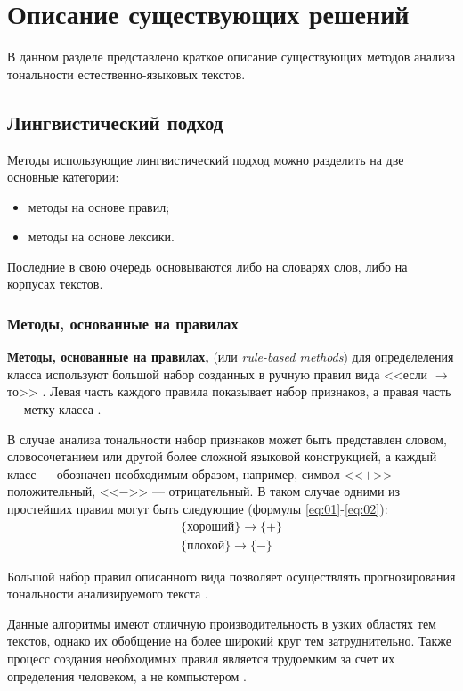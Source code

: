 \chapter{Описание существующих решений}

В данном разделе представлено краткое описание существующих методов анализа
тональности естественно-языковых текстов.

\section{Лингвистический подход}

Методы использующие лингвистический подход можно разделить на две основные
категории:
\begin{itemize}
    \item методы на основе правил;
    \item методы на основе лексики.
\end{itemize}

Последние в свою очередь основываются либо на словарях слов, либо на корпусах
текстов.

\subsection{Методы, основанные на правилах}

\textbf{Методы, основанные на правилах,} (или \textit{rule-based methods}) для
определеления класса используют большой набор созданных в ручную правил
вида <<если $\rightarrow$ то>> \cite{article14}. Левая часть каждого правила
показывает набор признаков, а правая часть --- метку класса \cite{article2}.

В случае анализа тональности набор признаков может быть представлен словом,
словосочетанием или другой более сложной языковой конструкцией, а каждый класс
--- обозначен необходимым образом, например, символ <<$+$>>\ --- положительный,
<<$-$>> --- отрицательный. В таком случае одними из простейших
правил могут быть следующие (формулы \ref{eq:01}-\ref{eq:02}):
\begin{eqnarray}
    \{\text{хороший}\} \rightarrow \{+\}\label{eq:01}\\
    \{\text{плохой}\} \rightarrow \{-\}\label{eq:02}
\end{eqnarray}

Большой набор правил описанного вида позволяет осуществлять
прогнозирования тональности анализируемого текста \cite{article16}.

Данные алгоритмы имеют отличную производительность в узких
областях тем текстов, однако их обобщение на более широкий круг тем
затруднительно. Также процесс создания необходимых правил является
трудоемким за счет их определения человеком, а не компьютером \cite{article15}.


